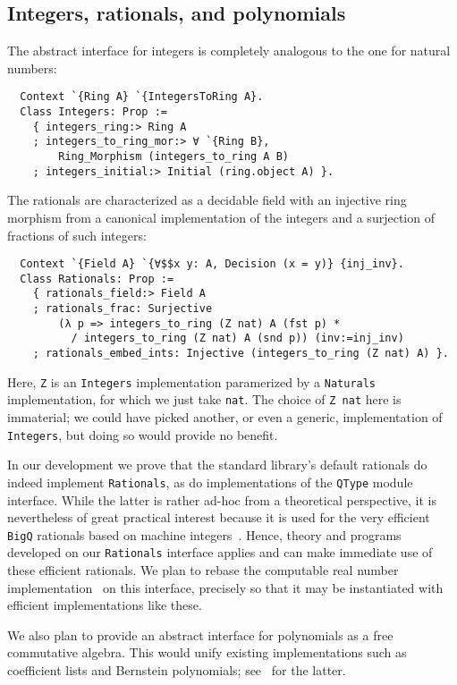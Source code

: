 \documentclass[a4paper,10pt,runningheads]{llncs}
\begin{document}
\subsection{Integers, rationals, and polynomials}

The abstract interface for integers is completely analogous to the one for natural numbers:
\begin{lstlisting}
  Context `{Ring A} `{IntegersToRing A}.
  Class Integers: Prop :=
    { integers_ring:> Ring A
    ; integers_to_ring_mor:> ∀ `{Ring B},
        Ring_Morphism (integers_to_ring A B)
    ; integers_initial:> Initial (ring.object A) }.
\end{lstlisting}

The rationals are characterized as a decidable field with an injective ring morphism from a canonical implementation of the integers and a surjection of fractions of such integers:
\begin{lstlisting}
  Context `{Field A} `{∀$$x y: A, Decision (x = y)} {inj_inv}.
  Class Rationals: Prop :=
    { rationals_field:> Field A
    ; rationals_frac: Surjective
        (λ p => integers_to_ring (Z nat) A (fst p) *
          / integers_to_ring (Z nat) A (snd p)) (inv:=inj_inv)
    ; rationals_embed_ints: Injective (integers_to_ring (Z nat) A) }.
\end{lstlisting}
Here, \lstinline|Z| is an \lstinline|Integers| implementation paramerized by a \lstinline|Naturals| implementation, for which we just take \lstinline|nat|. The choice of \lstinline|Z nat| here is immaterial; we could have picked another, or even a generic, implementation of \lstinline|Integers|, but doing so would provide no benefit.

In our development we prove that the standard library's default rationals do indeed implement \lstinline|Rationals|, as do implementations of the \lstinline|QType| module interface. While the latter is rather ad-hoc from a theoretical perspective, it is nevertheless of great practical interest because it is used for the very efficient \lstinline|BigQ| rationals based on machine integers~\cite{machineintegers}. Hence, theory and programs developed on our \lstinline|Rationals| interface applies and can make immediate use of these efficient rationals. We plan to rebase the computable real number implementation~\cite{Oconnor:real} on this interface, precisely so that it may be instantiated with efficient implementations like these.

We also plan to provide an abstract interface for polynomials as a free commutative algebra. This would unify existing implementations such as coefficient lists and Bernstein polynomials; see~\cite{ZumkellerPhD} for the latter.
\end{document}
